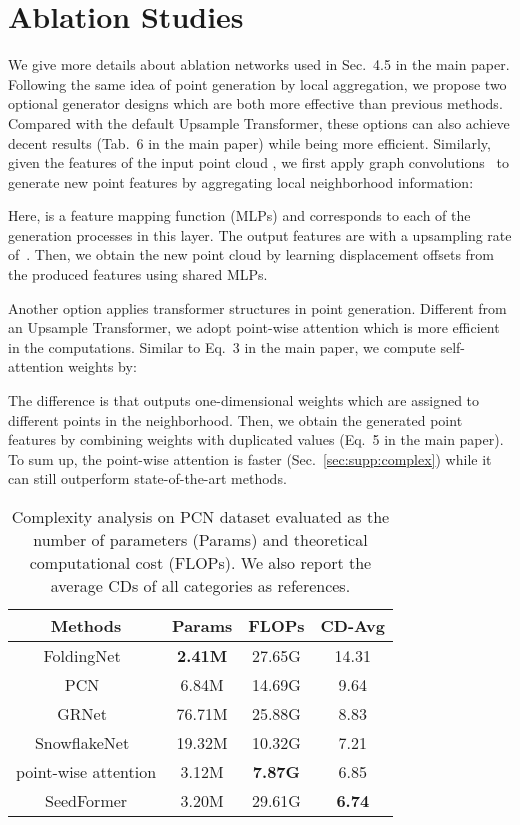 \section{Ablation Studies}
\label{sec:supp:ablation}
We give more details about ablation networks used in Sec.~4.5 in the main paper.
Following the same idea of point generation by local aggregation, we propose two optional generator designs which are both more effective than previous methods. Compared with the default Upsample Transformer, these options can also achieve decent results (Tab.~6 in the main paper) while being more efficient. Similarly, given the features  of the input point cloud , we first apply graph convolutions~\cite{wang2019dynamic} to generate new point features by aggregating local neighborhood information:

Here,  is a feature mapping function (MLPs) and  corresponds to each of the  generation processes in this layer. The output features are  with a upsampling rate of~. Then, we obtain the new point cloud by learning displacement offsets from the produced features using shared MLPs.

Another option applies transformer structures in point generation. Different from an Upsample Transformer, we adopt point-wise attention which is more efficient in the computations. Similar to Eq.~3 in the main paper, we compute self-attention weights by:

The difference is that  outputs one-dimensional weights which are assigned to different points in the neighborhood. Then, we obtain the generated point features by combining weights with duplicated values (Eq.~5 in the main paper). To sum up, the point-wise attention is faster (Sec.~\ref{sec:supp:complex}) while it can still outperform state-of-the-art methods.

\begin{table*}[t]
	\centering
\footnotesize
	\setlength{\tabcolsep}{10pt}
\caption{Complexity analysis on PCN dataset evaluated as the number of parameters (Params) and theoretical computational cost (FLOPs). We also report the average CDs of all categories as references.}
	\vspace{5pt}
	\begin{tabular}{c|cc|c}
		\toprule[1pt]
		Methods & Params & FLOPs & CD-Avg   \\
		\midrule[0.3pt]
		FoldingNet~\cite{yang2018foldingnet} & \textbf{2.41M} & 27.65G & 14.31 \\
		PCN~\cite{yuan2018pcn} & 6.84M & 14.69G & 9.64\\
		GRNet~\cite{xie2020grnet} & 76.71M & 25.88G & 8.83\\
		SnowflakeNet~\cite{xiang2021snowflakenet} & 19.32M & 10.32G & 7.21 \\
		\midrule[0.3pt]
		point-wise attention & 3.12M & \textbf{7.87G} & 6.85\\
		SeedFormer & 3.20M & 29.61G & \textbf{6.74} \\
		\bottomrule[1pt]
	\end{tabular}
	
	\label{table:complex}
\end{table*}

